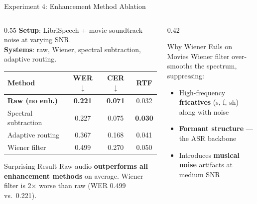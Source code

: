 \documentclass[aspectratio=169]{beamer}
\begin{document}
\begin{frame}{Experiment 4: Enhancement Method Ablation}
  \begin{columns}[T]
    \begin{column}{0.55\textwidth}
      \textbf{Setup}: LibriSpeech + movie soundtrack noise at varying SNR.\\
      \textbf{Systems}: raw, Wiener, spectral subtraction, adaptive routing.

      \vspace{0.3cm}
      \begin{center}
        \begin{tabular}{@{}lccc@{}}
          \toprule
          \textbf{Method} & \textbf{WER} $\downarrow$ & \textbf{CER} $\downarrow$ & \textbf{RTF} \\
          \midrule
          \rowcolor{lightgray}
          \textbf{Raw (no enh.)} & \textbf{0.221} & \textbf{0.071} & 0.032 \\
          Spectral subtraction & 0.227 & 0.075 & \textbf{0.030} \\
          Adaptive routing & 0.367 & 0.168 & 0.041 \\
          Wiener filter & 0.499 & 0.270 & 0.050 \\
          \bottomrule
        \end{tabular}
      \end{center}
      \vspace{0.3cm}
      \begin{alertblock}{Surprising Result}
        Raw audio \textbf{outperforms all enhancement methods} on average. Wiener filter is 2$\times$ worse than raw (WER 0.499 vs.\ 0.221).
      \end{alertblock}
    \end{column}
    \begin{column}{0.42\textwidth}
      \begin{block}{Why Wiener Fails on Movies}
        Wiener filter over-smooths the spectrum, suppressing:
        \begin{itemize}
          \item High-frequency \textbf{fricatives} (s, f, sh) along with noise
          \item \textbf{Formant structure} — the ASR backbone
          \item Introduces \textbf{musical noise} artifacts at medium SNR
        \end{itemize}

\end{block}
\end{column}
\end{columns}
\end{frame}
\end{document}
